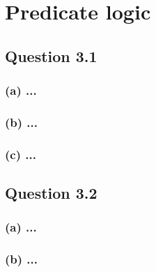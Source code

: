 \section{Predicate logic}
\subsection*{Question 3.1}
\subsubsection*{(a) \mdseries ...}
\subsubsection*{(b) \mdseries ...}
\subsubsection*{(c) \mdseries ...}

\subsection*{Question 3.2}
\subsubsection*{(a) \mdseries ...}
\subsubsection*{(b) \mdseries ...}